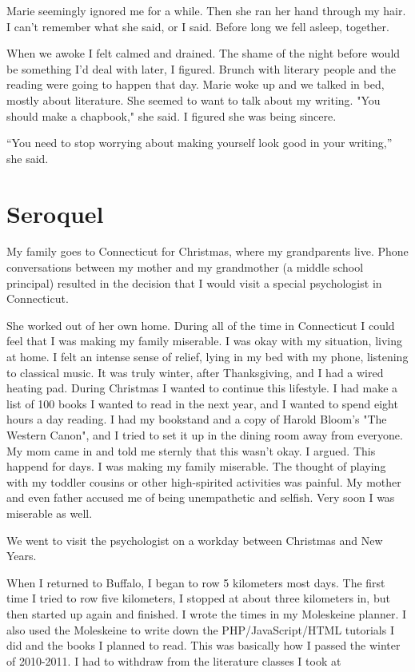 \documentclass[12pt]{article}
\begin{document}
Marie seemingly ignored me for a while. Then she ran her hand through my hair.
I can't remember what she said, or I said.  Before long we fell asleep,
together.

When we awoke I felt calmed and drained.  The shame of the night before would be
something I'd deal with later, I figured.  Brunch with literary people and the
reading were going to happen that day.  Marie woke up and we talked in bed,
mostly about literature.  She seemed to want to talk about my writing.  "You
should make a chapbook," she said.  I figured she was being sincere.  

``You need to stop worrying about making yourself look good in your writing,'' she
said.

\section{Seroquel}
My family goes to Connecticut for Christmas, where my grandparents live.  Phone
conversations between my mother and my grandmother (a middle school principal)
resulted in the decision that I would visit a special psychologist in
Connecticut.

She worked out of her own home.  During all of the time in Connecticut I could
feel that I was making my family miserable.  I was okay with my situation,
living at home.  I felt an intense sense of relief, lying in my bed with my
phone, listening to classical music.  It was truly winter, after Thanksgiving,
and I had a wired heating pad.  During Christmas I wanted to continue this
lifestyle.  I had make a list of 100 books I wanted to read in the next year,
and I wanted to spend eight hours a day reading.  I had my bookstand and a copy
of Harold Bloom's "The Western Canon", and I tried to set it up in the dining
room away from everyone.  My mom came in and told me sternly that this wasn't
okay.  I argued.  This happend for days.  I was making my family miserable.  The
thought of playing with my toddler cousins or other high-spirited activities was
painful.  My mother and even father accused me of being unempathetic and
selfish.  Very soon I was miserable as well.

We went to visit the psychologist on a workday between Christmas and New
Years.

When I returned to Buffalo, I began to row 5 kilometers most days.  The first
time I tried to row five kilometers, I stopped at about three kilometers in, but
then started up again and finished.  I wrote the times in my Moleskeine planner.
I also used the Moleskeine to write down the PHP/JavaScript/HTML tutorials I did
and the books I planned to read.  This was basically how I passed the winter of
2010-2011.  I had to withdraw from the literature classes I took at 
\end{document}
